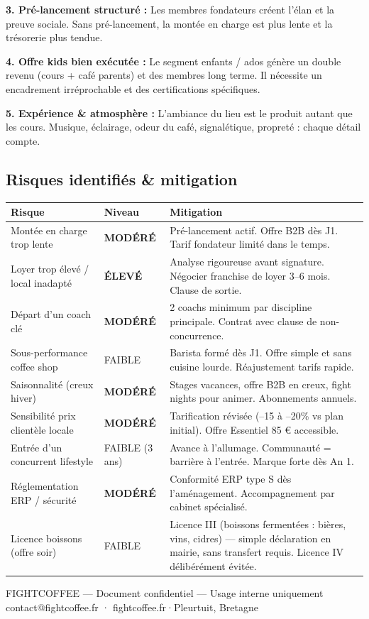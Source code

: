 \documentclass[11pt, a4paper]{article}
\newcommand{\redcell}[1]{\textcolor{fc-red}{\textbf{#1}}}
\newcommand{\goldcell}[1]{\textcolor{fc-gold}{\textbf{#1}}}
\begin{document}
\textbf{3. Pré-lancement structuré :} Les membres fondateurs créent l'élan et la preuve sociale. Sans pré-lancement, la montée en charge est plus lente et la trésorerie plus tendue.

\textbf{4. Offre kids bien exécutée :} Le segment enfants / ados génère un double revenu (cours + café parents) et des membres long terme. Il nécessite un encadrement irréprochable et des certifications spécifiques.

\textbf{5. Expérience \& atmosphère :} L'ambiance du lieu est le produit autant que les cours. Musique, éclairage, odeur du café, signalétique, propreté : chaque détail compte.

\subsection{Risques identifiés \& mitigation}

\begin{center}
\begin{tabular}{@{}p{4.5cm}p{2cm}p{6cm}@{}}
\toprule
\rowcolor{fc-ink}\color{white}\textbf{Risque} & \color{white}\textbf{Niveau} & \color{white}\textbf{Mitigation} \\
\midrule
Montée en charge trop lente & \goldcell{MODÉRÉ} & Pré-lancement actif. Offre B2B dès J1. Tarif fondateur limité dans le temps. \\
\rowcolor{fc-bg2} Loyer trop élevé / local inadapté & \redcell{ÉLEVÉ} & Analyse rigoureuse avant signature. Négocier franchise de loyer 3–6 mois. Clause de sortie. \\
Départ d'un coach clé & \goldcell{MODÉRÉ} & 2 coachs minimum par discipline principale. Contrat avec clause de non-concurrence. \\
\rowcolor{fc-bg2} Sous-performance coffee shop & \textcolor{green!60!black}{FAIBLE} & Barista formé dès J1. Offre simple et sans cuisine lourde. Réajustement tarifs rapide. \\
Saisonnalité (creux hiver) & \goldcell{MODÉRÉ} & Stages vacances, offre B2B en creux, fight nights pour animer. Abonnements annuels. \\
\rowcolor{fc-bg2} Sensibilité prix clientèle locale & \goldcell{MODÉRÉ} & Tarification révisée (–15 à –20\% vs plan initial). Offre Essentiel 85 € accessible. \\
Entrée d'un concurrent lifestyle & \textcolor{green!60!black}{FAIBLE (3 ans)} & Avance à l'allumage. Communauté = barrière à l'entrée. Marque forte dès An 1. \\
\rowcolor{fc-bg2} Réglementation ERP / sécurité & \goldcell{MODÉRÉ} & Conformité ERP type S dès l'aménagement. Accompagnement par cabinet spécialisé. \\
Licence boissons (offre soir) & \textcolor{green!60!black}{FAIBLE} & Licence III (boissons fermentées : bières, vins, cidres) — simple déclaration en mairie, sans transfert requis. Licence IV délibérément évitée. \\
\bottomrule
\end{tabular}
\end{center}

\vspace{16pt}
\begin{center}
\small\color{fc-ink3} FIGHTCOFFEE — Document confidentiel — Usage interne uniquement\\
\color{fc-red} contact@fightcoffee.fr · fightcoffee.fr\quad\color{fc-ink3}·\quad Pleurtuit, Bretagne
\end{center}
\end{document}
